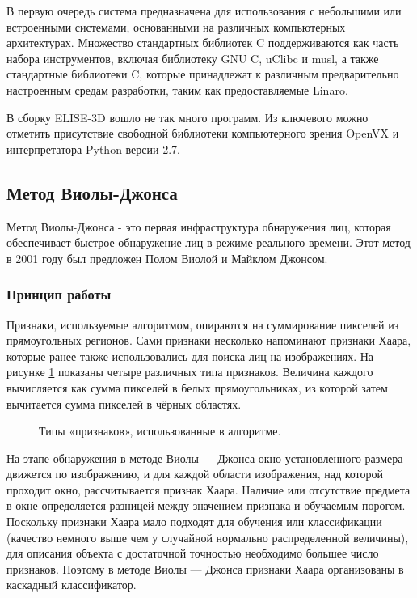 \documentclass[14pt,a4paper]{scrartcl}
\begin{document}
		В первую очередь система предназначена для использования с небольшими или встроенными системами, основанными на различных компьютерных архитектурах. Множество стандартных библиотек C поддерживаются как часть набора инструментов, включая библиотеку GNU C, uClibc и musl, а также стандартные библиотеки C, которые принадлежат к различным предварительно настроенным средам разработки, таким как предоставляемые Linaro\cite{bib:Buildroot_Wikipedia}. 
		
		В сборку ELISE-3D вошло не так много программ. Из ключевого можно отметить присутствие свободной библиотеки компьютерного зрения OpenVX и интерпретатора Python версии 2.7.
		
	\subsection{Метод Виолы-Джонса}
	
		Метод Виолы-Джонса - это первая инфраструктура обнаружения лиц, которая обеспечивает быстрое обнаружение лиц в режиме реального времени. Этот метод в 2001 году был предложен Полом Виолой и Майклом Джонсом\cite{bib:Viola-Jones_Wikipedia}.
	
		\subsubsection{Принцип работы}
		
			Признаки, используемые алгоритмом, опираются на суммирование пикселей из прямоугольных регионов. Сами признаки несколько напоминают признаки Хаара, которые ранее также использовались для поиска лиц на изображениях. На рисунке \ref{fig:Viola-Jones_types} показаны четыре различных типа признаков. Величина каждого вычисляется как сумма пикселей в белых прямоугольниках, из которой затем вычитается сумма пикселей в чёрных областях\cite{bib:Viola-Jones_Wikipedia_Ru}.
			
			\begin{figure}[h]
				\caption{Типы «признаков», использованные в алгоритме.}
				\label{fig:Viola-Jones_types}
			\end{figure}
		
			На этапе обнаружения в методе Виолы — Джонса окно установленного размера движется по изображению, и для каждой области изображения, над которой проходит окно, рассчитывается признак Хаара. Наличие или отсутствие предмета в окне определяется разницей между значением признака и обучаемым порогом. Поскольку признаки Хаара мало подходят для обучения или классификации (качество немного выше чем у случайной нормально распределенной величины), для описания объекта с достаточной точностью необходимо большее число признаков. Поэтому в методе Виолы — Джонса признаки Хаара организованы в каскадный классификатор\cite{bib:Haar_Wikipedia}.
			
\end{document}
